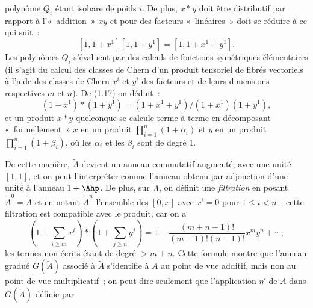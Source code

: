 polynôme $Q_i$ étant isobare de poids $i$. De plus, $x*y$ doit être distributif par rapport à l'«~addition~» $xy$ et pour des facteurs «~linéaires~» doit se réduire à ce qui suit~:
\begin{equation}\tag{1.17}
[1,1+x^1][1,1+y^1]=[1,1+x^1+y^1].
\end{equation}
Les polynômes $Q_i$ s'évaluent par des calculs de fonctions symétriques élémentaires (il s'agit du calcul des classes de Chern d'un produit tensoriel de fibrés vectoriels à l'aide des classes de Chern $x^i$ et $y^i$ des facteurs et de leurs dimensions respectives $m$ et $n$). De (1.17) on déduit~:
\begin{equation}\tag{1.17 bis}
(1+x^1)*(1+y^1)=(1+x^1+y^1)/(1+x^1)(1+y^1),
\end{equation}
et un produit $x*y$ quelconque se calcule terme à terme en décomposant «~formellement~» $x$ en un produit $\prod_{i=1}^n(1+\alpha_i)$ et $y$ en un produit $\prod_{i=1}^n(1+\beta_i)$, où les $\alpha_i$ et les $\beta_i$ sont de degré $1$.

De cette manière, $\widetilde A$ devient un anneau commutatif augmenté, avec une unité $[1,1]$, et on peut l'interpréter comme l'anneau obtenu par adjonction d'une unité à l'anneau $1+\Ahp$. De plus, sur $\widetilde A$, on définit une \emph{filtration} en posant $\widetilde A^0=\widetilde A$ et en notant $\widetilde A^n$ l'ensemble des $[0,x]$ avec $x^i=0$ pour $1\leq i<n$~; cette filtration est compatible avec le produit, car on a
\begin{equation}\tag{1.18}
\left(1+\sum_{i\geq m}x^i\right)*\left(1+\sum_{j\geq n}y^j\right)
=1-\frac{(m+n-1)!}{(m-1)!(n-1)!}x^m y^n+\cdots,
\end{equation}
les termes non écrits étant de degré $>m+n$. Cette formule montre que l'anneau gradué $G(\widetilde A)$ associé à $\widetilde A$ s'identifie à $A$ au point de vue additif, mais non au point de vue multiplicatif~; on peut dire seulement que l'application $\eta'$ de $A$ dans $G(\widetilde A)$ définie par
